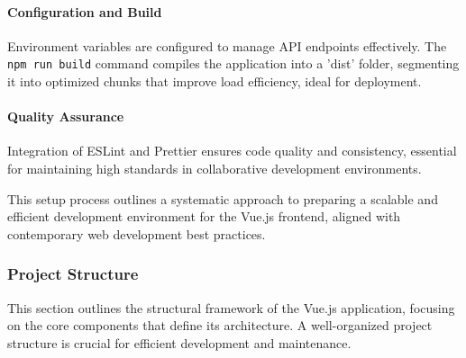 \paragraph{Configuration and Build}
Environment variables are configured to manage API endpoints effectively. The \texttt{npm run build} command compiles the application into a 'dist' folder, segmenting it into optimized chunks that improve load efficiency, ideal for deployment.

\paragraph{Quality Assurance}
Integration of ESLint and Prettier ensures code quality and consistency, essential for maintaining high standards in collaborative development environments.

This setup process outlines a systematic approach to preparing a scalable and efficient development environment for the Vue.js frontend, aligned with contemporary web development best practices.

\subsubsection{Project Structure}

This section outlines the structural framework of the Vue.js application, focusing on the core components that define its architecture. A well-organized project structure is crucial for efficient development and maintenance.

